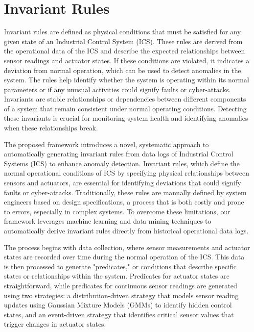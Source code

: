 \section{Invariant Rules}

\begin{definition}
Invariant rules are defined as physical conditions that must be satisfied for any given state of an Industrial Control System (ICS). These rules are derived from the operational data of the ICS and describe the expected relationships between sensor readings and actuator states. If these conditions are violated, it indicates a deviation from normal operation, which can be used to detect anomalies in the system. The rules help identify whether the system is operating within its normal parameters or if any unusual activities could signify faults or cyber-attacks\cite{21}. Invariants are stable relationships or dependencies between different components of a system that remain consistent under normal operating conditions. Detecting these invariants is crucial for monitoring system health and identifying anomalies when these relationships break\cite{23}.
\end{definition}
The proposed framework introduces a novel, systematic approach to automatically generating invariant rules from data logs of Industrial Control Systems (ICS) to enhance anomaly detection. Invariant rules, which define the normal operational conditions of ICS by specifying physical relationships between sensors and actuators, are essential for identifying deviations that could signify faults or cyber-attacks. Traditionally, these rules are manually defined by system engineers based on design specifications, a process that is both costly and prone to errors, especially in complex systems. To overcome these limitations, our framework leverages machine learning and data mining techniques to automatically derive invariant rules directly from historical operational data logs.

The process begins with data collection, where sensor measurements and actuator states are recorded over time during the normal operation of the ICS. This data is then processed to generate "predicates," or conditions that describe specific states or relationships within the system. Predicates for actuator states are straightforward, while predicates for continuous sensor readings are generated using two strategies: a distribution-driven strategy that models sensor reading updates using Gaussian Mixture Models (GMMs) to identify hidden control states, and an event-driven strategy that identifies critical sensor values that trigger changes in actuator states.

